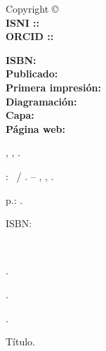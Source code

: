 
\newpage
\thispagestyle{empty}

{\fontsize{0.035\textwidth}{0} \normalfont
\noindent Copyright \copyright\ \imprimiryear\ \myauthor\\ %
\noindent \textbf{ISNI  ::} \imprimirISNI\\
\noindent \textbf{ORCID ::} \imprimirOrcid\\

\vspace{20pt}

\noindent \textbf{ISBN:} \imprimirisbn\\ %
\noindent \textbf{Publicado:} \imprimireditora\\ %
\noindent \textbf{Primera impresión:} \imprimiryear\\ %
\noindent \textbf{Diagramación:} \myauthor\\ %
\noindent \textbf{Capa:} \myauthor\\ %
\noindent \textbf{Página web:} \ImprimirLinkHomePageLivro\\ %
\vfill
\begin{center}
\begin{catalografica}%
	\myauthorlastname, \myauthorname, \myauthorborn.%

	\hspace{0.5cm} \mytitle: \mysubtitle~/ \myauthor. -- %
	\imprimirlocal, \imprimireditora, \imprimiryear.
	
	\hspace{0.5cm} \pageref{LastPage} p.: \imprimirpapersize.\\ %
	
	\hspace{0.5cm}
	\parbox[t]{\textwidth}{\imprimirtipotrabalho}%

	\hspace{0.5cm}
	\parbox[t]{\textwidth}{ISBN: \imprimirisbn}\\


	\hspace{0.5cm}
	\begin{inparaenum}[1.]
		\item \palavraschavea.
		\item \palavraschaveb.
		\item \palavraschavec.
	\end{inparaenum}
	\begin{inparaenum}[I.]
		\item Título.%
	\end{inparaenum}


\end{catalografica}
\end{center}}
